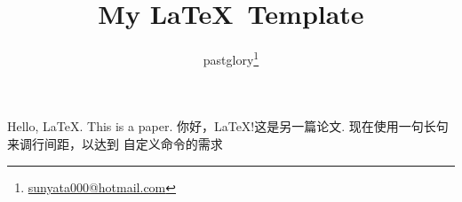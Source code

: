 \documentclass{report}
\title {My \LaTeX\ Template}
\author{pastglory\thanks{\href{mailto:sunyata000@hotmail.com}{sunyata000@hotmail.com}}}
\begin{document}
\maketitle

    Hello, \LaTeX.
    This is a paper\cite{zhang2020sparch}.
    你好，\LaTeX!这是另一篇论文\cite{sadi2017design}. 现在使用一句长句来调行间距，以达到
    自定义命令的需求


\end{document}
